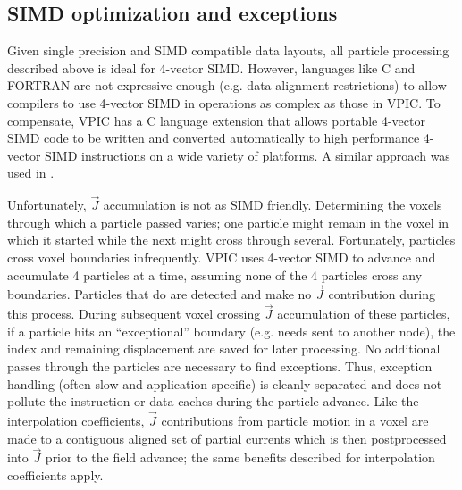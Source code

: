 \documentclass[10pt]{article}
\newcommand{\vecJ}{\vec{J}}
\begin{document}
\subsection{SIMD optimization and exceptions}

Given single precision and SIMD compatible data layouts, all particle
processing described above is ideal for 4-vector SIMD.  However,
languages like C and FORTRAN are not expressive enough (e.g. data
alignment restrictions) to allow compilers to use 4-vector SIMD in
operations as complex as those in VPIC.  To compensate, VPIC has a C
language extension that allows portable 4-vector SIMD code to be
written and converted automatically to high performance 4-vector SIMD
instructions on a wide variety of platforms.  A similar approach was
used in \cite{Bowers_et_al_2006}.


Unfortunately, $\vecJ$ accumulation is not as SIMD friendly.
Determining the voxels through which a particle passed varies; one
particle might remain in the voxel in which it started while the next
might cross through several.  Fortunately, particles cross voxel
boundaries infrequently.  VPIC uses 4-vector SIMD to advance and
accumulate 4 particles at a time, assuming none of the 4 particles
cross any boundaries.  Particles that do are detected and make no
$\vecJ$ contribution during this process.  During subsequent voxel
crossing $\vecJ$ accumulation of these particles, if a particle hits
an ``exceptional'' boundary (e.g. needs sent to another node), the
index and remaining displacement are saved for later processing.  No
additional passes through the particles are necessary to find
exceptions.  Thus, exception handling (often slow and application
specific) is cleanly separated and does not pollute the instruction or
data caches during the particle advance.  Like the interpolation
coefficients, $\vecJ$ contributions from particle motion in a voxel
are made to a contiguous aligned set of partial currents which is then
postprocessed into $\vecJ$ prior to the field advance; the same
benefits described for interpolation coefficients apply.
\end{document}
